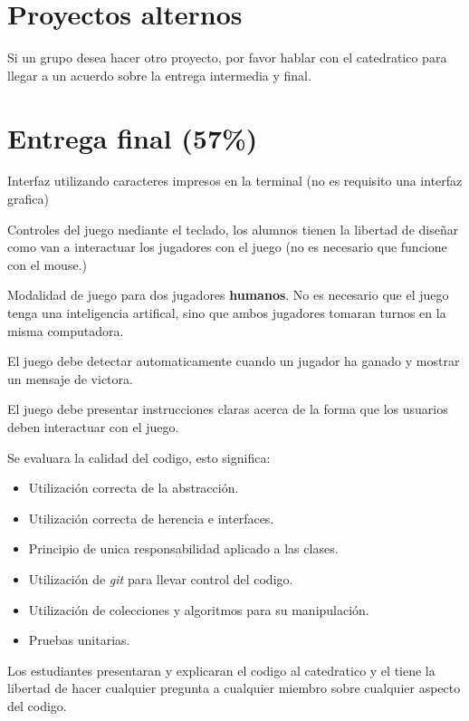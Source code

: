 \documentclass{article}
\begin{document}
\section*{Proyectos alternos}
Si un grupo desea hacer otro proyecto, por favor hablar con el
catedratico para llegar a un acuerdo sobre la entrega intermedia y
final.

\section*{Entrega final (57\%)}
\begin{itemize}
        \item{Interfaz utilizando caracteres impresos en la terminal
        (no es requisito una interfaz grafica)}
        \item{Controles del juego mediante el teclado, los alumnos
        tienen la libertad de dise\~nar como van a interactuar
        los jugadores con el juego (no es necesario que funcione con
        el mouse.)}
        \item{Modalidad de juego para dos jugadores {\bf humanos}. No
        es necesario que el juego tenga una inteligencia artifical,
        sino que ambos jugadores tomaran turnos en la misma computadora.}
        \item{El juego debe detectar automaticamente cuando un jugador
        ha ganado y mostrar un mensaje de victora.}
        \item{El juego debe presentar instrucciones claras acerca
        de la forma que los usuarios deben interactuar con el juego.}
        \item{Se evaluara la calidad del codigo, esto significa:
        \begin{itemize}
                \item{Utilizaci\'on correcta de la abstracci\'on.}
                \item{Utilizaci\'on correcta de herencia e interfaces.}
                \item{Principio de unica responsabilidad aplicado a las clases.}
                \item{Utilizaci\'on de \emph{git} para llevar control del codigo.}
                \item{Utilizaci\'on de colecciones y algoritmos para su manipulaci\'on.}
                \item{Pruebas unitarias.}
        \end{itemize}
        \item{Los estudiantes presentaran y explicaran el codigo al catedratico
        y el tiene la libertad de hacer cualquier pregunta a cualquier miembro
        sobre cualquier aspecto del codigo.}
        }
\end{itemize}
\end{document}
